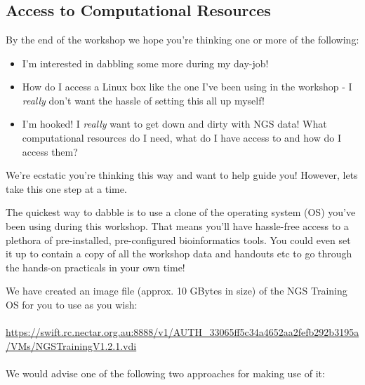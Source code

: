 \setModuleContributions{%
  
}

\chapter{\moduleTitle}
\newpage

\section{Access to Computational Resources}

By the end of the workshop we hope you're thinking one or more of the following:

\begin{itemize}
\item I'm interested in dabbling some more during my day-job!
\item How do I access a Linux box like the one I've been using in the workshop -
I \emph{really} don't want the hassle of setting this all up myself!
\item I'm hooked! I \emph{really} want to get down and dirty with NGS data! What
computational resources do I need, what do I have access to and how do I access
them?
\end{itemize}

We're ecstatic you're thinking this way and want to help guide you! However, lets
take this one step at a time.

The quickest way to dabble is to use a clone of the operating system (OS) you've
been using during this workshop. That means you'll have hassle-free access to a
plethora of pre-installed, pre-configured bioinformatics tools. You could even set it
up to contain a copy of all the workshop data and handouts etc to go through the
hands-on practicals in your own time!

We have created an image file (approx. 10 GBytes in size) of the NGS Training OS for you to
use as you wish:
\\\\
\url{https://swift.rc.nectar.org.au:8888/v1/AUTH_33065ff5c34a4652aa2fefb292b3195a/VMs/NGSTrainingV1.2.1.vdi}
\\\\
We would advise one of the following two approaches for making use of it:


